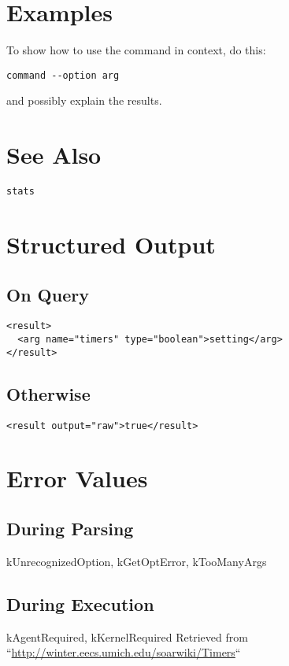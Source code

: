 \documentclass[10pt]{article}
\begin{document}
\section*{ Examples }


 To show how to use the command in context, do this: \begin{verbatim}
command --option arg

\end{verbatim}



 and possibly explain the results. 
\section*{ See Also }
\begin{verbatim}
stats

\end{verbatim}
\section*{ Structured Output }
\subsection*{ On Query }
\begin{verbatim}
<result>
  <arg name="timers" type="boolean">setting</arg>
</result>

\end{verbatim}
\subsection*{ Otherwise }
\begin{verbatim}
<result output="raw">true</result>

\end{verbatim}
\section*{ Error Values }
\subsection*{ During Parsing }


 kUnrecognizedOption, kGetOptError, kTooManyArgs
\subsection*{ During Execution }


 kAgentRequired, kKernelRequired Retrieved from ``\url{http://winter.eecs.umich.edu/soarwiki/Timers}``
\end{document}
